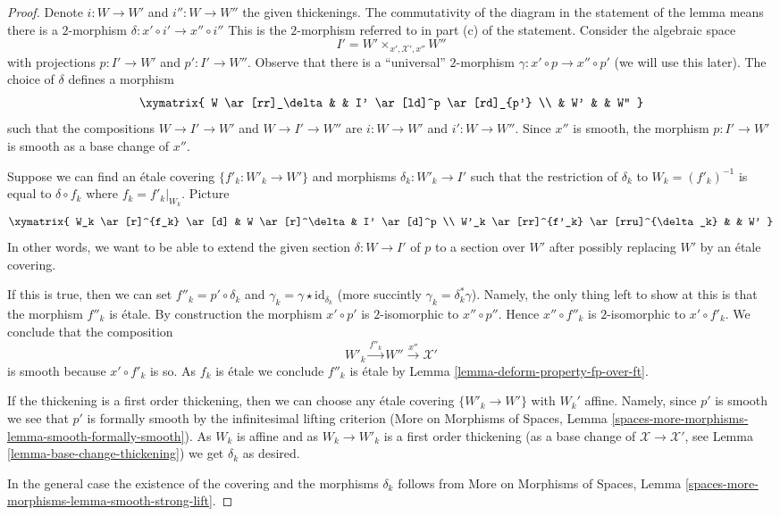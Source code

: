 \begin{proof}
Denote $i : W \to W'$ and $i'' : W \to W''$ the given thickenings.
The commutativity of the diagram in the statement of the lemma
means there is a $2$-morphism $\delta : x' \circ i' \to x'' \circ i''$
This is the $2$-morphism referred to in part (c) of the statement.
Consider the algebraic space
$$
I' = W' \times_{x', \mathcal{X}', x''} W''
$$
with projections $p : I' \to W'$ and $p' : I' \to W''$.
Observe that there is a ``universal'' $2$-morphism
$\gamma : x' \circ p \to x'' \circ p'$ (we will use this later).
The choice of $\delta$ defines a morphism
$$
\xymatrix{
W \ar[rr]_\delta & & I' \ar[ld]^p \ar[rd]_{p'} \\
& W' & & W''
}
$$
such that the compositions $W \to I' \to W'$ and $W \to I' \to W''$
are $i : W \to W'$ and $i' : W \to W''$.
Since $x''$ is smooth, the morphism $p : I' \to W'$ is smooth
as a base change of $x''$.

\medskip\noindent
Suppose we can find an \'etale covering $\{f'_k : W'_k \to W'\}$
and morphisms $\delta_k : W'_k \to I'$ such that the restriction
of $\delta_k$ to $W_k = (f'_k)^{-1}$ is equal to $\delta \circ f_k$
where $f_k = f'_k|_{W_k}$. Picture
$$
\xymatrix{
W_k \ar[r]^{f_k} \ar[d] & W \ar[r]^\delta & I' \ar[d]^p \\
W'_k \ar[rr]^{f'_k} \ar[rru]^{\delta_k} & & W'
}
$$
In other words, we want to be able to extend the given section
$\delta : W \to I'$ of $p$ to a section over $W'$ after possibly
replacing $W'$ by an \'etale covering.

\medskip\noindent
If this is true, then we can set $f''_k = p' \circ \delta_k$
and $\gamma_k = \gamma \star \text{id}_{\delta_k}$ (more succintly
$\gamma_k = \delta_k^*\gamma$). Namely, the only thing left to show
at this is that the morphism $f''_k$ is \'etale.
By construction the morphism $x' \circ p'$ is $2$-isomorphic
to $x'' \circ p''$. Hence $x'' \circ f''_k$ is $2$-isomorphic
to $x' \circ f'_k$. We conclude that the composition
$$
W'_k \xrightarrow{f''_k} W'' \xrightarrow{x''} \mathcal{X}'
$$
is smooth because $x' \circ f'_k$ is so.
As $f_k$ is \'etale we conclude $f''_k$ is \'etale
by Lemma \ref{lemma-deform-property-fp-over-ft}.

\medskip\noindent
If the thickening is a first order thickening, then we can
choose any \'etale covering $\{W'_k \to W'\}$ with $W_k'$ affine.
Namely, since $p'$ is smooth we see that $p'$ is formally smooth by the
infinitesimal lifting criterion (More on Morphisms of Spaces, Lemma
\ref{spaces-more-morphisms-lemma-smooth-formally-smooth}).
As $W_k$ is affine and as $W_k \to W'_k$ is a first order thickening
(as a base change of $\mathcal{X} \to \mathcal{X}'$, see
Lemma \ref{lemma-base-change-thickening}) we get $\delta_k$ as
desired.

\medskip\noindent
In the general case the existence of the covering and the morphisms
$\delta_k$ follows from More on Morphisms of Spaces, Lemma
\ref{spaces-more-morphisms-lemma-smooth-strong-lift}.
\end{proof}

